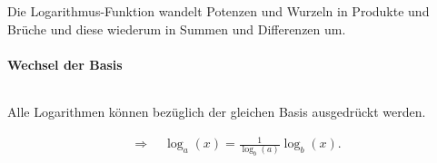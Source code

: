 Die Logarithmus-Funktion wandelt Potenzen und Wurzeln in Produkte und Brüche und diese wiederum in Summen und Differenzen um.

\paragraph{Wechsel der Basis}$~$

Alle Logarithmen können bezüglich der gleichen Basis ausgedrückt werden. 

\begin{minipage}{0.5\textwidth}
\end{minipage}
\begin{minipage}{0.49\textwidth}
    \vspace{1.4cm}
    \begin{align}
        \Rightarrow \quad \log_a(x) = \frac{1}{\log_b(a)} \log_b(x).
    \end{align}
\end{minipage}

